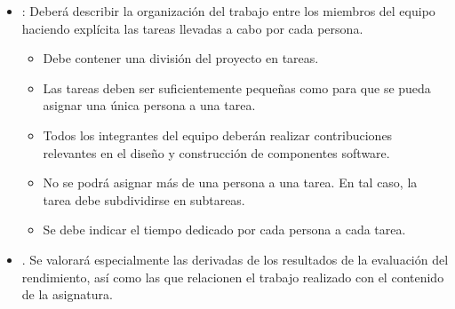 \begin{itemize}
\item {}:
      Deberá describir la organización del trabajo entre los miembros del equipo
      haciendo explícita las tareas llevadas a cabo por cada persona.
        \begin{itemize}
          \item Debe contener una división del proyecto en tareas.
          \item Las tareas deben ser suficientemente pequeñas como para que se
                pueda asignar una única persona a una tarea.
          \item Todos los integrantes del equipo deberán realizar contribuciones
                relevantes en el diseño y construcción de componentes software.
          \item No se podrá asignar más de una persona a una tarea.
                En tal caso, la tarea debe subdividirse en subtareas.
          \item Se debe indicar el tiempo dedicado por cada persona a cada tarea.
        \end{itemize}

\item {}.
      Se valorará especialmente las derivadas de los resultados de la evaluación
      del rendimiento, así como las que relacionen el trabajo realizado con el contenido
      de la asignatura.

\end{itemize}
